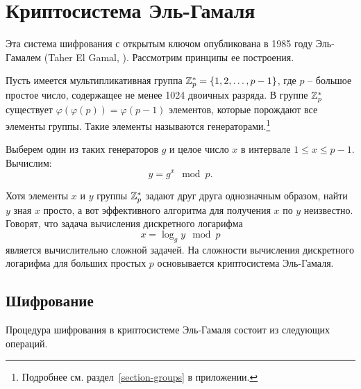 \section{Криптосистема Эль-Гамаля}

Эта система шифрования с открытым ключом опубликована в 1985 году Эль-Гамалем (Taher El Gamal, \cite{ElGamal:1985}). Рассмотрим принципы ее построения.

Пусть имеется мультипликативная группа $\mathbb{Z}_p^* = \{1, 2, \dots, p-1\}$, где $p$ -- большое простое число, содержащее не менее 1024 двоичных разряда. В группе $\mathbb{Z}_p^*$ существует $\varphi( \varphi( p ) ) = \varphi( p - 1 )$ элементов, которые порождают все элементы группы. Такие элементы называются генераторами.\footnote{Подробнее см. раздел~\ref{section-groups} в приложении.}

Выберем один из таких генераторов $g$ и целое число $x$ в интервале $1 \le x \le p-1$. Вычислим:
    \[ y = g^x \mod p. \]

Хотя элементы $x$ и $y$ группы $\mathbb{Z}_p^*$ задают друг друга однозначным образом, найти $y$ зная $x$ просто, а вот эффективного алгоритма для получения $x$ по $y$ неизвестно. Говорят, что задача вычисления дискретного логарифма
	\[ x = \log_g y \mod p \]
является вычислительно сложной задачей. На сложности вычисления дискретного логарифма для больших простых $p$ основывается криптосистема Эль-Гамаля.

\subsection{Шифрование}

Процедура шифрования в криптосистеме Эль-Гамаля состоит из следующих операций.

